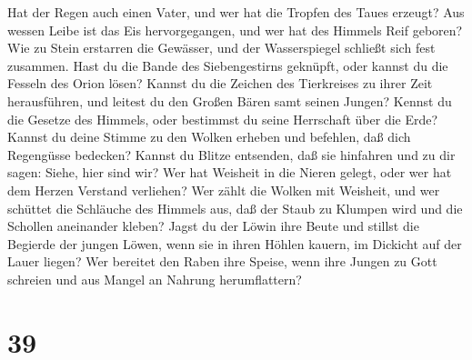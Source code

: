  Hat der Regen auch einen Vater, und wer hat die Tropfen
des Taues erzeugt?  Aus wessen Leibe ist das Eis
hervorgegangen, und wer hat des Himmels Reif geboren? 
Wie zu Stein erstarren die Gewässer, und der Wasserspiegel schließt sich
fest zusammen.  Hast du die Bande des Siebengestirns
geknüpft, oder kannst du die Fesseln des Orion lösen? 
Kannst du die Zeichen des Tierkreises zu ihrer Zeit herausführen, und
leitest du den Großen Bären samt seinen Jungen?  Kennst
du die Gesetze des Himmels, oder bestimmst du seine Herrschaft über die
Erde?  Kannst du deine Stimme zu den Wolken erheben und
befehlen, daß dich Regengüsse bedecken?  Kannst du Blitze
entsenden, daß sie hinfahren und zu dir sagen: Siehe, hier sind wir?
 Wer hat Weisheit in die Nieren gelegt, oder wer hat dem
Herzen Verstand verliehen?  Wer zählt die Wolken mit
Weisheit, und wer schüttet die Schläuche des Himmels aus,
 daß der Staub zu Klumpen wird und die Schollen
aneinander kleben?  Jagst du der Löwin ihre Beute und
stillst die Begierde der jungen Löwen,  wenn sie in ihren
Höhlen kauern, im Dickicht auf der Lauer liegen?  Wer
bereitet den Raben ihre Speise, wenn ihre Jungen zu Gott schreien und
aus Mangel an Nahrung herumflattern?

\hypertarget{section-38}{%
\section{39}\label{section-38}}

